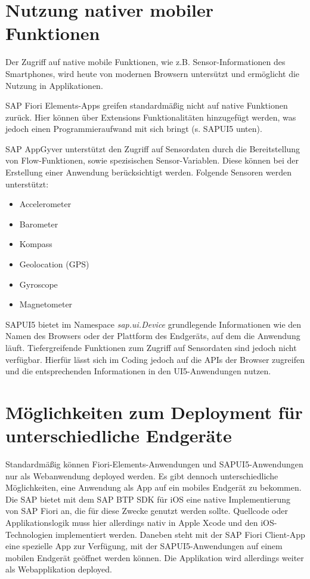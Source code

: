 \section{Nutzung nativer mobiler Funktionen}

Der Zugriff auf native mobile Funktionen, wie z.B. Sensor-Informationen des Smartphones, wird heute von modernen Browsern untersützt und ermöglicht die Nutzung in Applikationen.

SAP Fiori Elements-Apps greifen standardmäßig nicht auf native Funktionen zurück. Hier können über Extensions Funktionalitäten hinzugefügt werden, was jedoch einen Programmieraufwand mit sich bringt (s. SAPUI5 unten).

SAP AppGyver unterstützt den Zugriff auf Sensordaten durch die Bereitstellung von Flow-Funktionen, sowie spezisischen Sensor-Variablen. Diese können bei der Erstellung einer Anwendung berücksichtigt werden. Folgende Sensoren werden unterstützt:

\begin{itemize}[noitemsep]
\item Accelerometer 
\item Barometer
\item Kompass
\item Geolocation (GPS) 
\item Gyroscope
\item Magnetometer
\end{itemize}

SAPUI5 bietet im Namespace \textit{sap.ui.Device} grundlegende Informationen wie den Namen des Browsers oder der Plattform des Endgeräts, auf dem die Anwendung läuft. Tiefergreifende Funktionen zum Zugriff auf Sensordaten sind  jedoch nicht verfügbar. Hierfür lässt sich im Coding jedoch auf die APIs der Browser zugreifen und die entsprechenden Informationen in den UI5-Anwendungen nutzen.

\section{Möglichkeiten zum Deployment für unterschiedliche Endgeräte}

Standardmäßig können Fiori-Elements-Anwendungen und SAPUI5-Anwendungen nur als Webanwendung deployed werden. Es gibt dennoch unterschiedliche Möglichkeiten, eine Anwendung als App auf ein mobiles Endgerät zu bekommen. Die SAP bietet mit dem SAP BTP SDK für iOS eine native Implementierung von SAP Fiori an, die für diese Zwecke genutzt werden sollte. Quellcode oder Applikationslogik muss hier allerdings nativ in Apple Xcode und den iOS-Technologien implementiert werden. Daneben steht mit der SAP Fiori Client-App eine spezielle App zur Verfügung, mit der SAPUI5-Anwendungen auf einem mobilen Endgerät geöffnet werden können. Die Applikation wird allerdings weiter als Webapplikation deployed.

